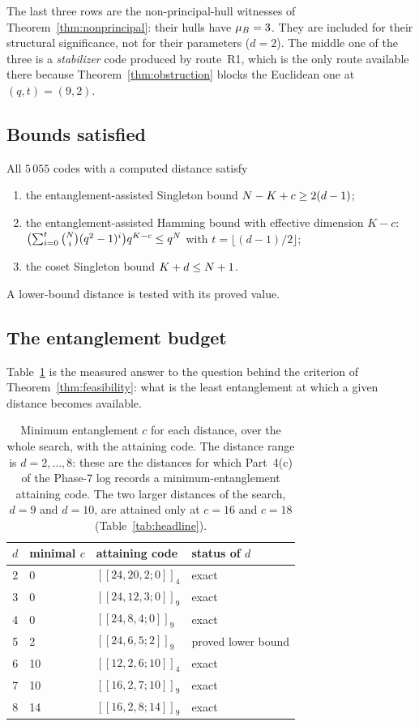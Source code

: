 The last three rows are the non-principal-hull witnesses of
Theorem~\ref{thm:nonprincipal}: their hulls have $\mu_{B}=3$. They are
included for their structural significance, not for their parameters
($d=2$). The middle one of the three is a \emph{stabilizer} code produced by
route~R1, which is the only route available there because
Theorem~\ref{thm:obstruction} blocks the Euclidean one at $(q,t)=(9,2)$.

\subsection{Bounds satisfied}

\begin{proposition}[bounds]\label{prop:bounds}
All $5\,055$ codes with a computed distance satisfy
\begin{enumerate}[label=\textnormal{(\alph*)},leftmargin=*]
\item the entanglement-assisted Singleton bound $N-K+c\ge2(d-1)$;
\item the entanglement-assisted Hamming bound with effective dimension $K-c$:
  $\bigl(\sum_{i=0}^{t}\binom{N}{i}(q^2-1)^i\bigr)q^{K-c}\le q^{N}$
  with $t=\lfloor(d-1)/2\rfloor$;
\item the coset Singleton bound $K+d\le N+1$.
\end{enumerate}
A lower-bound distance is tested with its proved value.
\end{proposition}

\subsection{The entanglement budget}

Table~\ref{tab:budget} is the measured answer to the question behind the
criterion of Theorem~\ref{thm:feasibility}: what is the least entanglement at
which a given distance becomes available.

\begin{table}[t]
\centering
\caption{Minimum entanglement $c$ for each distance, over the whole search,
with the attaining code. The distance range is $d=2,\dots,8$: these are the
distances for which Part~4(c) of the Phase-7 log records a minimum-entanglement
attaining code. The two larger distances of the search, $d=9$ and $d=10$, are
attained only at $c=16$ and $c=18$ (Table~\ref{tab:headline}).}
\label{tab:budget}
\begin{tabular}{@{}clll@{}}
\toprule
$d$ & minimal $c$ & attaining code & status of $d$\\
\midrule
2 & 0  & $[[24,20,2;0]]_4$  & exact\\
3 & 0  & $[[24,12,3;0]]_9$  & exact\\
4 & 0  & $[[24,8,4;0]]_9$   & exact\\
5 & 2  & $[[24,6,5;2]]_9$   & proved lower bound\\
6 & 10 & $[[12,2,6;10]]_4$  & exact\\
7 & 10 & $[[16,2,7;10]]_9$  & exact\\
8 & 14 & $[[16,2,8;14]]_9$  & exact\\
\bottomrule
\end{tabular}
\end{table}

